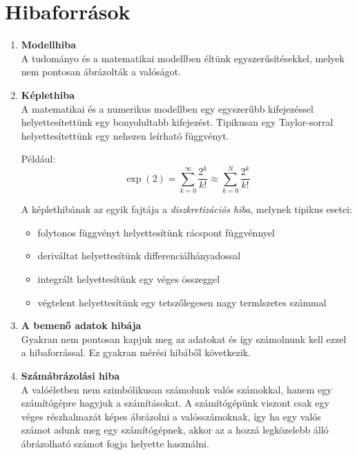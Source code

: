 \section{Hibaforrások}
\begin{enumerate}
    \item \textbf{Modellhiba} \\
    A tudományo és a matematikai modellben éltünk egyszerűsítésekkel, melyek nem pontosan ábrázolták a valóságot.

    \item \textbf{Képlethiba} \\
    A matematikai és a numerikus modellben egy egyszerűbb kifejezéssel helyettesítettünk egy bonyolultabb kifejezést. Tipikusan egy Taylor-sorral helyettesítettünk egy nehezen leírható függvényt.
    
    Például:
    \begin{equation*}
        \exp(2) = \sum_{k=0}^{\infty} \frac{2^{k}}{k!} \approx \sum_{k=0}^{N} \frac{2^{k}}{k!}
    \end{equation*}

    A képlethibának az egyik fajtája a \textit{diszkretizációs hiba}, melynek tipikus esetei:
    \begin{itemize}
        \item folytonos függvényt helyettesítünk rácspont függvénnyel
        \item deriváltat helyettesítünk differenciálhányadossal
        \item integrált helyettesítünk egy véges összeggel
        \item végtelent helyettesítünk egy tetszőlegesen nagy termlszetes számmal
    \end{itemize}

    \item \textbf{A bemenő adatok hibája} \\
    Gyakran nem pontosan kapjuk meg az adatokat és így számolnunk kell ezzel a hibaforrással. Ez gyakran mérési hibáből következik.

    \item \textbf{Számábrázolási hiba} \\
    A valóéletben nem szimbólikusan számolunk valós számokkal, hanem egy számítógépre hagyjuk a számításokat. A számítógépünk viszont csak egy véges részhalmazát képes ábrázolni a valósszámoknak, így ha egy valós számot adunk meg egy számítógépnek, akkor az a hozzá legközelebb álló ábrázolható számot fogja helyette használni.
\end{enumerate}

